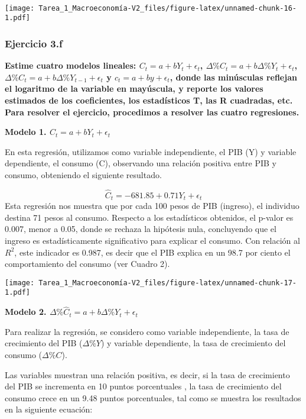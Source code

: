 \documentclass[
]{article}
\begin{document}
~

\texttt{[image: Tarea\_1\_Macroeconomía-V2\_files/figure-latex/unnamed-chunk-16-1.pdf]}
\newpage

\hypertarget{ejercicio-3.f}{%
\subsubsection{Ejercicio 3.f}\label{ejercicio-3.f}}

\textbf{Estime cuatro modelos lineales: \(C_t=a+bY_t+\epsilon_t\),
\(\Delta \%C_t=a+b\Delta \%Y_{t}+\epsilon_t\),
\(\Delta \%C_t=a+b\Delta \%Y_{t-1}+\epsilon_t\) y
\(c_t=a+by+\epsilon_t\), donde las minúsculas reflejan el logaritmo de
la variable en mayúscula, y reporte los valores estimados de los
coeficientes, los estadísticos T, las R cuadradas, etc. Para resolver el
ejercicio, procedimos a resolver las cuatro regresiones.}

\begin{center}
\textbf{Modelo 1. $C_t=a+bY_t+\epsilon_t$}
\end{center}

En esta regresión, utilizamos como variable independiente, el PIB (Y) y
variable dependiente, el consumo (C), observando una relación positiva
entre PIB y consumo, obteniendo el siguiente resultado.

\[\hat C_t=-681.85+0.71 Y_t+\epsilon_t \] Esta regresión nos muestra que
por cada 100 pesos de PIB (ingreso), el individuo destina 71 pesos al
consumo. Respecto a los estadísticos obtenidos, el p-valor es 0.007,
menor a 0.05, donde se rechaza la hipótesis nula, concluyendo que el
ingreso es estadísticamente significativo para explicar el consumo. Con
relación al \(R^2\), este indicador es 0.987, es decir que el PIB
explica en un 98.7 por ciento el comportamiento del consumo (ver Cuadro
2).

\texttt{[image: Tarea\_1\_Macroeconomía-V2\_files/figure-latex/unnamed-chunk-17-1.pdf]}

\begin{center}
\textbf{Modelo 2. $\Delta \% \hat C_t=a+b\Delta \%Y_{t}+\epsilon_t$}
\end{center}

Para realizar la regresión, se considero como variable independiente, la
tasa de crecimiento del PIB (\(\Delta \%Y\)) y variable dependiente, la
tasa de crecimiento del consumo (\(\Delta \%C\)).

Las variables muestran una relación positiva, es decir, si la tasa de
crecimiento del PIB se incrementa en 10 puntos porcentuales , la tasa de
crecimiento del consumo crece en un 9.48 puntos porcentuales, tal como
se muestra los resultados en la siguiente ecuación:
\end{document}
